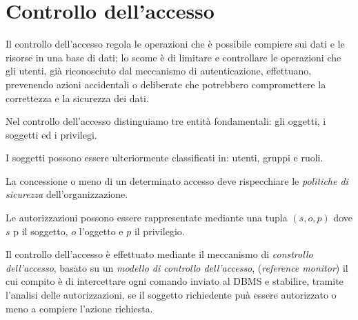 \section{Controllo dell'accesso}%
\label{sec:Controllo dell'accesso}
Il controllo dell'accesso regola le operazioni che è possibile compiere sui dati
e le risorse in una base di dati; lo scome è di limitare e controllare le
operazioni che gli utenti, già riconosciuto dal meccanismo di autenticazione,
effettuano, prevenendo azioni accidentali o deliberate che potrebbero
compromettere la correttezza e la sicurezza dei dati.

Nel controllo dell'accesso distinguiamo tre entità fondamentali: gli oggetti, i
soggetti ed i privilegi.

I soggetti possono essere ulteriormente classificati in: utenti, gruppi e ruoli.

La concessione o meno di un determinato accesso deve rispecchiare le
\emph{politiche di sicurezza} dell'organizzazione.

Le autorizzazioni possono essere rappresentate mediante una tupla $(s,o,p)$ dove
$s$ p il soggetto, $o$ l'oggetto e $p$ il privilegio.

Il controllo dell'accesso è effettuato mediante il meccanismo di
\emph{constrollo dell'accesso}, basato su un \emph{modello di controllo
dell'accesso}, (\emph{reference monitor}) il cui compito è di intercettare ogni
comando inviato al DBMS e stabilire, tramite l'analisi delle autorizzazioni, se
il soggetto richiedente puà essere autorizzato o meno a compiere l'azione
richiesta.
